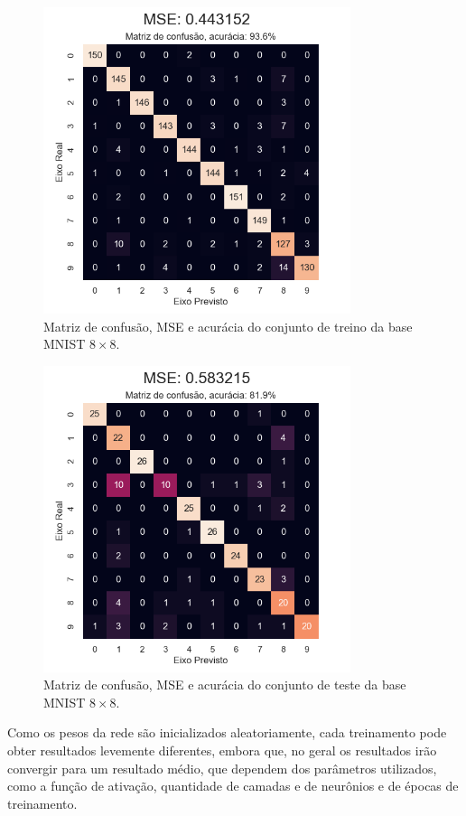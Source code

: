 \begin{figure}[htb]
\centering
\includegraphics[width=9cm]{figuras/mnist_treino}
\caption{Matriz de confusão, MSE e acurácia do conjunto de treino da base MNIST ${8\times8}$.}
\label{fig:mnist_treino}
\end{figure}

\begin{figure}[htb]
\centering
\includegraphics[width=9cm]{figuras/mnist_test}
\caption{Matriz de confusão, MSE e acurácia do conjunto de teste da base MNIST ${8\times8}$.}
\label{fig:mnist_test}
\end{figure}

Como os pesos da rede são inicializados aleatoriamente, cada treinamento pode obter resultados levemente diferentes, embora que, no geral os resultados irão convergir para um resultado médio, que dependem dos parâmetros utilizados, como a função de ativação, quantidade de camadas e de neurônios e de épocas de treinamento.

